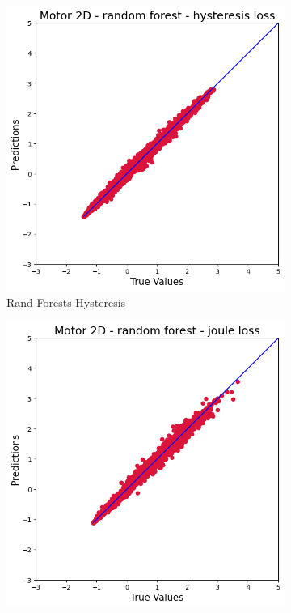 \documentclass{article}
\begin{document}
\begin{figure}[!htbp]
    \vspace{0.3cm}
    
    \begin{subfigure}[b]{0.23\textwidth}
        \centering
        \includegraphics[width=\textwidth]{images/2D/rand_for_hysteresis.png}
        \caption{Rand Forests Hysteresis}
    \end{subfigure}
    \hfill
    \begin{subfigure}[b]{0.23\textwidth}
        \centering
        \includegraphics[width=\textwidth]{images/2D/rand_for_joule.png}

\end{subfigure}
\end{figure}
\end{document}
